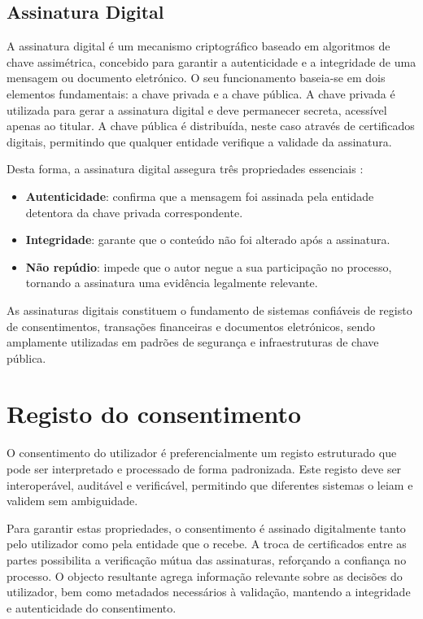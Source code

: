 \subsection{Assinatura Digital}

A assinatura digital é um mecanismo criptográfico baseado em algoritmos de chave assimétrica, concebido para garantir a autenticidade e a integridade de uma mensagem ou documento eletrónico. O seu funcionamento baseia-se em dois elementos fundamentais: a chave privada e a chave pública. A chave privada é utilizada para gerar a assinatura digital e deve permanecer secreta, acessível apenas ao titular. A chave pública é distribuída, neste caso através de certificados digitais, permitindo que qualquer entidade verifique a validade da assinatura.

Desta forma, a assinatura digital assegura três propriedades essenciais \citep{digitalsignatures}:
\begin{itemize}
    \item \textbf{Autenticidade}: confirma que a mensagem foi assinada pela entidade detentora da chave privada correspondente.
    \item \textbf{Integridade}: garante que o conteúdo não foi alterado após a assinatura.
    \item \textbf{Não repúdio}: impede que o autor negue a sua participação no processo, tornando a assinatura uma evidência legalmente relevante.
\end{itemize}

As assinaturas digitais constituem o fundamento de sistemas confiáveis de registo de consentimentos, transações financeiras e documentos eletrónicos, sendo amplamente utilizadas em padrões de segurança e infraestruturas de chave pública.

\section{Registo do consentimento}

O consentimento do utilizador é preferencialmente um registo estruturado que pode ser interpretado e processado de forma padronizada. Este registo deve ser interoperável, auditável e verificável, permitindo que diferentes sistemas o leiam e validem sem ambiguidade.

Para garantir estas propriedades, o consentimento é assinado digitalmente tanto pelo utilizador como pela entidade que o recebe. A troca de certificados entre as partes possibilita a verificação mútua das assinaturas, reforçando a confiança no processo. O objecto resultante agrega informação relevante sobre as decisões do utilizador, bem como metadados necessários à validação, mantendo a integridade e autenticidade do consentimento.

